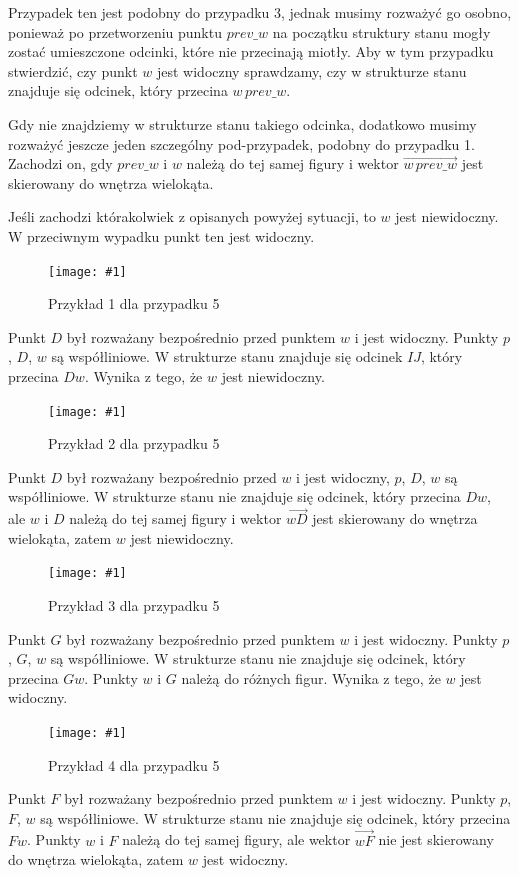 \documentclass[12pt]{article}
\newcommand{\imgcustomsize}[3]{
	\begin{figure}[H]
		\centering
		\texttt{[image: \#1]}
		\caption{#2}
		\label{#1}
	\end{figure}
}
\newcommand{\img}[2]{\imgcustomsize{#1}{#2}{0.5}}
\begin{document}
			\vspace{\baselineskip} %
			Przypadek ten jest podobny do przypadku 3, jednak musimy rozważyć go osobno, ponieważ po przetworzeniu punktu $ prev\_w $ na początku struktury stanu mogły zostać umieszczone odcinki, które nie przecinają miotły. Aby w tym przypadku stwierdzić, czy punkt $ w $ jest widoczny sprawdzamy, czy w strukturze stanu znajduje się odcinek, który przecina $ w\,prev\_w $. 
			
			\vspace{\baselineskip} %
			Gdy nie znajdziemy w strukturze stanu takiego odcinka, dodatkowo musimy rozważyć jeszcze jeden szczególny pod-przypadek, podobny do przypadku 1. Zachodzi on, gdy $ prev\_w $ i $ w $ należą do tej samej figury i wektor $ \overrightarrow{w\,prev\_w} $ jest skierowany do wnętrza wielokąta.
			
			\vspace{\baselineskip} %
			Jeśli zachodzi którakolwiek z opisanych powyżej sytuacji, to $ w $ jest niewidoczny. W przeciwnym wypadku punkt ten jest widoczny.
			
			
			\img{przypadek5.1.jpg}{Przykład 1 dla przypadku 5}
			
			Punkt $ D $ był rozważany bezpośrednio przed punktem $ w $ i jest widoczny. Punkty $ p $, $ D $, $ w $ są współliniowe. W strukturze stanu znajduje się odcinek $IJ$, który przecina $Dw$. Wynika z tego, że $ w $ jest niewidoczny.
			
			\img{przypadek5.2.jpg}{Przykład 2 dla przypadku 5}
			
			Punkt $ D $ był rozważany bezpośrednio przed $ w $ i jest widoczny, $ p $, $ D $, $ w $ są współliniowe. W strukturze stanu nie znajduje się odcinek, który przecina $Dw$, ale $ w $ i $ D $ należą do tej samej figury i wektor $ \overrightarrow{wD} $ jest skierowany do wnętrza wielokąta, zatem $ w $ jest niewidoczny.
			
			\img{przypadek5.3.jpg}{Przykład 3 dla przypadku 5}
			
			Punkt $ G $ był rozważany bezpośrednio przed punktem $ w $ i jest widoczny. Punkty $ p $, $ G $, $ w $ są współliniowe. W strukturze stanu nie znajduje się odcinek, który przecina $Gw$. Punkty $ w $ i $ G $ należą do różnych figur. Wynika z tego, że $ w $ jest widoczny.
			
			\img{przypadek5.4.jpg}{Przykład 4 dla przypadku 5}
			
			Punkt $ F $ był rozważany bezpośrednio przed punktem $ w $ i jest widoczny. Punkty $ p $, $ F $, $ w $ są współliniowe. W strukturze stanu nie znajduje się odcinek, który przecina $Fw$. Punkty $ w $ i $ F $ należą do tej samej figury, ale wektor $ \overrightarrow{wF} $ nie jest skierowany do wnętrza wielokąta, zatem $ w $ jest widoczny.
			
\end{document}
